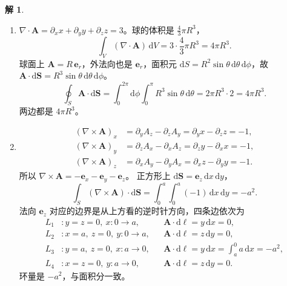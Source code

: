 \documentclass[11pt]{article}
\theoremstyle{remark}
\theoremstyle{definition}
\newtheorem{solution}{解}
\begin{document}
\begin{solution}
\begin{enumerate}
  \item $\nabla\cdot\mathbf{A}=\partial_x x+\partial_y y+\partial_z z=3$。球的体积是 $\tfrac43\pi R^3$，
    \[
      \int_V(\nabla\cdot\mathbf{A})\,\mathrm{d}V
      =3\cdot\frac43\pi R^3
      =4\pi R^3.
    \]
    球面上 $\mathbf{A}=R\,\mathbf{e}_r$，外法向也是 $\mathbf{e}_r$，面积元
    $\mathrm{d}S=R^2\sin\theta\,\mathrm{d}\theta\,\mathrm{d}\phi$，故
    $\mathbf{A}\cdot\mathrm{d}\mathbf{S}=R^3\sin\theta\,\mathrm{d}\theta\,\mathrm{d}\phi$。
    \[
      \oint_S\mathbf{A}\cdot\mathrm{d}\mathbf{S}
      =\int_0^{2\pi}\!\mathrm{d}\phi\int_0^{\pi}R^3\sin\theta\,\mathrm{d}\theta
      =2\pi R^3\cdot 2
      =4\pi R^3.
    \]
    两边都是 $4\pi R^3$。

  \item
    \begin{align*}
      (\nabla\times\mathbf{A})_x
      &=\partial_y A_z-\partial_z A_y
       =\partial_y x-\partial_z z=-1,\\
      (\nabla\times\mathbf{A})_y
      &=\partial_z A_x-\partial_x A_z
       =\partial_z y-\partial_x x=-1,\\
      (\nabla\times\mathbf{A})_z
      &=\partial_x A_y-\partial_y A_x
       =\partial_x z-\partial_y y=-1.
    \end{align*}
    所以 $\nabla\times\mathbf{A}=-\mathbf{e}_x-\mathbf{e}_y-\mathbf{e}_z$。
    正方形上 $\mathrm{d}\mathbf{S}=\mathbf{e}_z\,\mathrm{d}x\,\mathrm{d}y$，
    \[
      \int_S(\nabla\times\mathbf{A})\cdot\mathrm{d}\mathbf{S}
      =\int_0^a\int_0^a(-1)\,\mathrm{d}x\,\mathrm{d}y
      =-a^2.
    \]
    法向 $\mathbf{e}_z$ 对应的边界是从上方看的逆时针方向，四条边依次为
    \begin{align*}
      L_1&: y=z=0,\ x:0\to a,
        &&\mathbf{A}\cdot\mathrm{d}\boldsymbol{\ell}=y\,\mathrm{d}x=0,\\
      L_2&: x=a,\ z=0,\ y:0\to a,
        &&\mathbf{A}\cdot\mathrm{d}\boldsymbol{\ell}=z\,\mathrm{d}y=0,\\
      L_3&: y=a,\ z=0,\ x:a\to 0,
        &&\mathbf{A}\cdot\mathrm{d}\boldsymbol{\ell}=y\,\mathrm{d}x
          =\int_a^0 a\,\mathrm{d}x=-a^2,\\
      L_4&: x=z=0,\ y:a\to 0,
        &&\mathbf{A}\cdot\mathrm{d}\boldsymbol{\ell}=z\,\mathrm{d}y=0.
    \end{align*}
    环量是 $-a^2$，与面积分一致。
\end{enumerate}
\end{solution}
\end{document}
